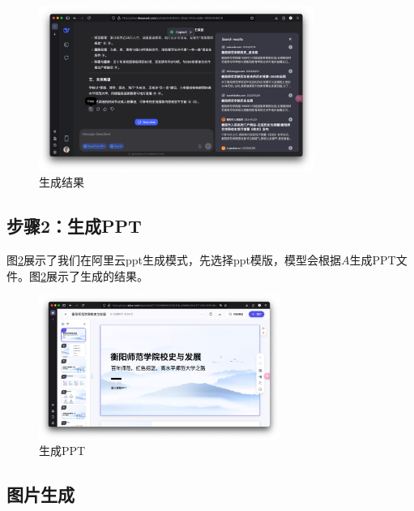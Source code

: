 \documentclass{article}
\begin{document}
\begin{figure}[htbp]
  \centering
  \includegraphics[width=0.8\textwidth]{./fig/search-result.png}
  \caption{生成结果}
  \label{fig:generate_result}
\end{figure}

\subsection{步骤2：生成PPT}
图\ref{fig:generate_ppt}展示了我们在阿里云ppt生成模式，先选择ppt模版，模型会根据$A$生成PPT文件。图\ref{fig:generate_ppt}展示了生成的结果。
\begin{figure}[htbp]
  \centering
  \includegraphics[width=0.7\textwidth]{./fig/ppt.png}
  \caption{生成PPT}
  \label{fig:generate_ppt}
\end{figure}

\subsection{图片生成}

% 
% 
\end{document}
